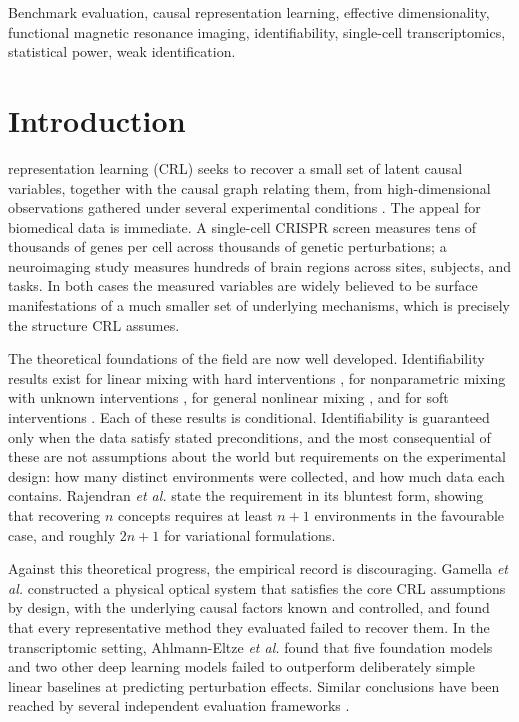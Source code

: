 \documentclass[journal,twoside,web]{ieeecolor}
\begin{document}
\begin{IEEEkeywords}
Benchmark evaluation, causal representation learning, effective
dimensionality, functional magnetic resonance imaging, identifiability,
single-cell transcriptomics, statistical power, weak identification.
\end{IEEEkeywords}

\section{Introduction}
\label{sec:intro}

 representation learning (CRL) seeks to recover a small
set of latent causal variables, together with the causal graph relating them,
from high-dimensional observations gathered under several experimental
conditions \cite{scholkopf2021}. The appeal for biomedical data is immediate.
A single-cell CRISPR screen measures tens of thousands of genes per cell
across thousands of genetic perturbations; a neuroimaging study measures
hundreds of brain regions across sites, subjects, and tasks. In both cases the
measured variables are widely believed to be surface manifestations of a much
smaller set of underlying mechanisms, which is precisely the structure CRL
assumes.

The theoretical foundations of the field are now well developed.
Identifiability results exist for linear mixing with hard interventions
\cite{squires2023}, for nonparametric mixing with unknown interventions
\cite{kugelgen2023}, for general nonlinear mixing \cite{buchholz2023}, and for
soft interventions \cite{zhang2023}. Each of these results is conditional.
Identifiability is guaranteed only when the data satisfy stated preconditions,
and the most consequential of these are not assumptions about the world but
requirements on the experimental design: how many distinct environments were
collected, and how much data each contains. Rajendran \emph{et al.}
\cite{rajendran2024} state the requirement in its bluntest form, showing that
recovering $n$ concepts requires at least $n+1$ environments in the favourable
case, and roughly $2n+1$ for variational formulations.

Against this theoretical progress, the empirical record is discouraging.
Gamella \emph{et al.} \cite{gamella2025} constructed a physical optical system
that satisfies the core CRL assumptions by design, with the underlying causal
factors known and controlled, and found that every representative method they
evaluated failed to recover them. In the transcriptomic setting,
Ahlmann-Eltze \emph{et al.} \cite{ahlmann2025} found that five foundation
models and two other deep learning models failed to outperform deliberately
simple linear baselines at predicting perturbation effects. Similar
conclusions have been reached by several independent evaluation frameworks
\cite{vollenweider2026,vinas2026}.
\end{document}
